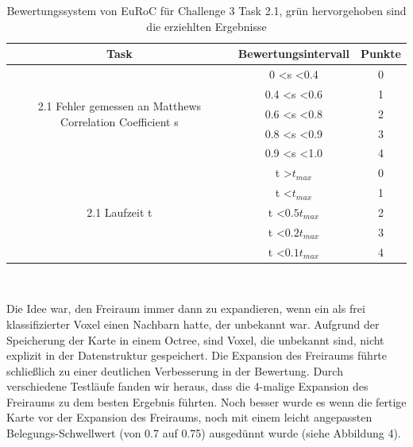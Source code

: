 \documentclass[12pt,titlepage, a4paper]{article}
\begin{document}
\begin{table}
\centering
\begin{tabular}{c|c|c}
Task & Bewertungsintervall & Punkte\\
\hline
\multirow{5}{210pt}{2.1 Fehler gemessen an Matthews Correlation Coefficient s} & 0 \textless s \textless 0.4 & 0 \\
 & 0.4 \textless  s \textless 0.6 & 1\\  
  & 0.6 \textless  s \textless 0.8 & 2\\
 & \cellcolor{green!10.0}0.8 \textless  s \textless 0.9 &\cellcolor{green!10.0} 3\\
 & 0.9 \textless  s \textless 1.0 & 4\\
\hline
\multirow{5}{210pt}{2.1 Laufzeit t} & t \textgreater $t_{max}$ & 0 \\
 & t \textless $t_{max}$ & 1\\  
  &\cellcolor{green!10.0} t \textless $0.5 t_{max}$ &\cellcolor{green!10.0} 2\\
  & t \textless $0.2 t_{max}$ & 3\\
 & t \textless $0.1 t_{max}$ & 4\\
\hline
\end{tabular}\\
\vspace{10mm}
\caption{Bewertungssystem von EuRoC für Challenge 3 Task 2.1, grün hervorgehoben sind die erziehlten Ergebnisse}
\label{table:scoringt2}
\end{table}

Die Idee war, den Freiraum immer dann zu expandieren, wenn ein als frei klassifizierter Voxel einen Nachbarn hatte, der unbekannt war. Aufgrund der Speicherung der Karte in einem Octree, sind Voxel, die unbekannt sind, nicht explizit in der Datenstruktur gespeichert. Die Expansion des Freiraums führte schließlich zu einer deutlichen Verbesserung in der Bewertung. Durch verschiedene Testläufe fanden wir heraus, dass die 4-malige Expansion des Freiraums zu dem besten Ergebnis führten. Noch besser wurde es wenn die fertige Karte vor der Expansion des Freiraums, noch mit einem leicht angepassten Belegungs-Schwellwert (von 0.7 auf 0.75) ausgedünnt wurde (siehe Abbildung 4). 
\end{document}
